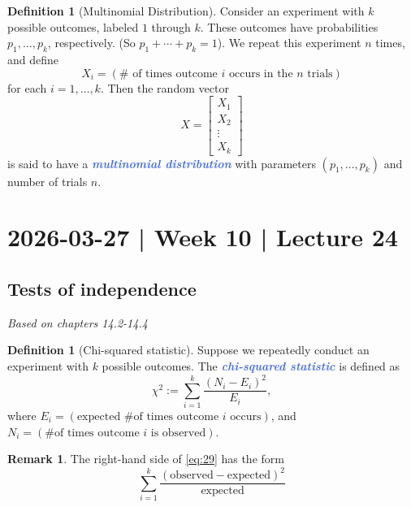 \documentclass[10pt]{article}
\theoremstyle{definition}
\newtheorem{definition}[theorem]{Definition}
\newtheorem{remark}[theorem]{Remark}
\newcommand{\1}[1]{\textbf{1}_{\left[#1\right]}} %
\newcommand{\demph}[1]{\textcolor{RoyalBlue}{\textbf{\slshape #1}}} %
\begin{document}
\begin{definition}[Multinomial Distribution]
  \label{def:multinomial}
  Consider an experiment with $k$ possible outcomes, labeled $1$ through $k$.
  These outcomes have probabilities $p_{1},\ldots,p_{k}$, respectively. (So
  $p_{1}+\cdots+p_{k}=1$). We repeat this experiment $n$ times, and define
  \begin{equation*}
    X_{i}= (\# \text{ of times outcome $i$ occurs in the $n$ trials})
  \end{equation*}
  for each $i=1,\ldots,k$. Then the random vector
  \begin{equation*}
    X =
    \begin{bmatrix}
      X_{1}\\X_{2}\\\vdots \\ X_{k}
    \end{bmatrix}
  \end{equation*}
  is said to have a \demph{multinomial distribution} with parameters
  $(p_{1},\ldots,p_{k})$ and number of trials $n$.
\end{definition}


\newpage
\section{2026-03-27 | Week 10 | Lecture 24}
\subsection{Tests of independence}
\textit{Based on chapters 14.2-14.4}


\begin{definition}[Chi-squared statistic]
  Suppose we repeatedly conduct an experiment with $k$ possible outcomes. The
  \demph{chi-squared statistic} is defined as
  \begin{equation}\label{eq:29}
    \chi^{2}:= \sum_{i=1}^{k} \frac{\left(N_{i}-E_{i}\right)^{2}}{E_{i}},
  \end{equation}
  where $E_{i} = (\text{expected \# of times outcome $i$ occurs})$, and
  $N_{i}= (\text{\# of times outcome $i$ is observed})$.
\end{definition}

\begin{remark}
  The right-hand side of \cref{eq:29} has the form
  \begin{equation*}
    \sum_{i=1}^{k} \frac{\left( \text{observed}- \text{expected} \right)^{2} }{ \text{expected}} 
  \end{equation*}
\end{remark}
\end{document}
